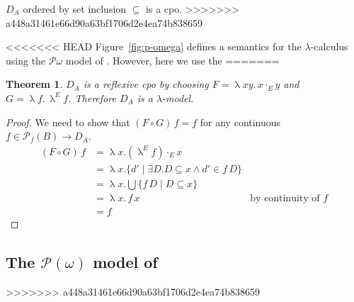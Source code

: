\documentclass{tufte-handout}
\newtheorem{theorem}{Theorem}%
\begin{document}
$D_A$ ordered by set inclusion $\subseteq$ is a cpo.
>>>>>>> a448a31461e66d90a63bf1706d2e4ea74b838659


<<<<<<< HEAD
Figure~\ref{fig:p-omega} defines a semantics for the $\lambda$-calculus
using the $\mathcal{P}\omega$ model of \citet{Scott:1976lq}.
However, here we use the 
=======
\begin{theorem}
  $D_A$ is a reflexive cpo by choosing $F = \uplambda x y.\, x \cdot_E
  y$ and $G= \uplambda f.\, \uplambda^E f$. Therefore $D_A$ is a
  $\lambda$-model.
\end{theorem}
\begin{proof}
  We need to show that $(F \circ G)\,f = f$
  for any continuous $f \in \mathcal{P}_f(B) \to D_A$.
  \begin{align*}
    (F \circ G)\,f &= \uplambda x. (\uplambda^E f) \cdot_E x\\
    &= \uplambda x. \{ d' \mid \exists D. D \subseteq x \land d' \in f\,D \}\\
    &= \uplambda x. \bigcup \{ f\,D \mid D \subseteq x \} \\
    &= \uplambda x.\, f\, x  & \text{by continuity of } f \\
    &= f
  \end{align*}
\end{proof}

\subsection{The $\mathcal{P}(\omega)$ model of \citet{Scott:1976lq}}
\label{sec:p-omega}
>>>>>>> a448a31461e66d90a63bf1706d2e4ea74b838659


\citet{barendregt84:_lambda_calculus}

\newcommand{\ES}[0]{\mathcal{E}_S}
\newcommand{\SSEM}[1]{\ES\,#1\,}
\end{document}
